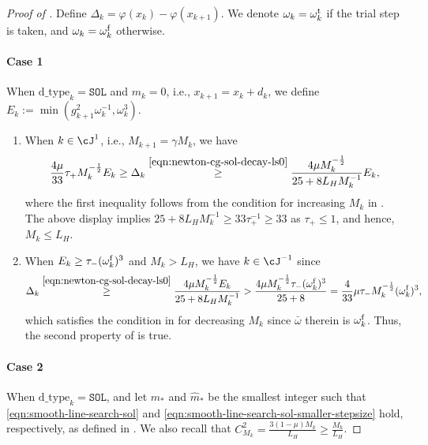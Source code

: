 \begin{proof}[Proof of ]
    Define $\Delta_k = \varphi(x_k) - \varphi(x_{k+1})$.
    We denote $\omega_k = \omega_k^{\mathrm{t}}$ if the trial step is taken, and $\omega_k = \omega_k^{\mathrm{f}}$ otherwise.

    \paragraph{Case 1}
    When $\text{d\_type}_k = \texttt{SOL}$ and $m_k = 0$, i.e., $x_{k+1} = x_k + d_k$, 
    we define $E_k := \min \left(  g_{k+1}^2\omega_k^{-1}, \omega_k^3 \right)$.
    \begin{enumerate}
        \item When $k \in \cJ^1$, i.e., $M_{k + 1} = \gamma M_k$, we have
        \begin{align*}
            \frac{4\mu}{33} \tau_+ M_k^{-\frac{1}{2}} E_k
            \geq \Delta_k
            \overset{\eqref{eqn:newton-cg-sol-decay-ls0}}{\geq}
        \frac{4\mu M_k^{-\frac{1}{2}}}{25 + 8L_HM_k^{-1}} E_k,
        \end{align*}
        where the first inequality follows from the condition for increasing $M_k$ in .
        The above display implies $25 + 8L_HM_k^{-1} \geq 33\tau_+^{-1} \geq 33$ as $\tau_+ \leq 1$, and hence, $M_k \leq L_H$.
        \item When $E_k \geq \tau_-(\omega_k^{\mathrm{f}})^3$ 
        and $M_k > L_H$, 
        we have $k\in \cJ^{-1}$ since
        \begin{align*}
            \Delta_k
            \overset{\eqref{eqn:newton-cg-sol-decay-ls0}}{\geq}
            \frac{4\mu M_k^{-\frac{1}{2}} E_k}{25 + 8L_HM_k^{-1}}
            > \frac{4\mu M_k^{-\frac{1}{2}}\tau_- (\omega_k^{\mathrm{f}})^3}{25 + 8}
            = \frac{4}{33}\mu\tau_-  M_k^{-\frac{1}{2}}(\omega_k^{\mathrm{f}})^3,
        \end{align*}
        which satisfies the condition in  for decreasing $M_k$ since $\bar \omega$ therein is $\omega_k^{\mathrm{f}}$.
        Thus, the second property of  is true.
    \end{enumerate}

    \paragraph{Case 2}
    When $\text{d\_type}_k = \texttt{SOL}$, 
    and let $m_*$ and $\hat m_*$ be the smallest integer such that \eqref{eqn:smooth-line-search-sol} and \eqref{eqn:smooth-line-search-sol-smaller-stepsize} hold, respectively, as defined in .
    We also recall that $C_{M_k}^2 = \frac{3(1-\mu)M_k}{L_H} \geq \frac{M_k}{L_H}$.


\end{proof}
